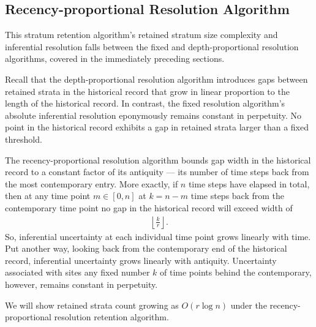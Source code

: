 \subsection{Recency-proportional Resolution Algorithm}
\label{sec:recency-proportional-resolution-algo}

This stratum retention algorithm's retained stratum size complexity and inferential resolution falls between the fixed and depth-proportional resolution algorithms, covered in the immediately preceding sections.

Recall that the depth-proportional resolution algorithm introduces gaps between retained strata in the historical record that grow in linear proportion to the length of the historical record.
In contrast, the fixed resolution algorithm's absolute inferential resolution eponymously remains constant in perpetuity.
No point in the historical record exhibits a gap in retained strata larger than a fixed threshold.

The recency-proportional resolution algorithm bounds gap width in the historical record to a constant factor of its antiquity --- its number of time steps back from the most contemporary entry.
More exactly, if $n$ time steps have elapsed in total, then at any time point $m \in [0, n]$ at $k = n - m$ time steps back from the contemporary time point no gap in the historical record will exceed width of
\begin{align}
  \left\lfloor \frac{k}{r} \right\rfloor.
  \label{eqn:rpr-gap}
\end{align}
So, inferential uncertainty at each individual time point grows linearly with time.
Put another way, looking back from the contemporary end of the historical record, inferential uncertainty grows linearly with antiquity.
Uncertainty associated with sites any fixed number $k$ of time points behind the contemporary, however, remains constant in perpetuity.

We will show retained strata count growing as $O(r\log{n})$ under the recency-proportional resolution retention algorithm.

